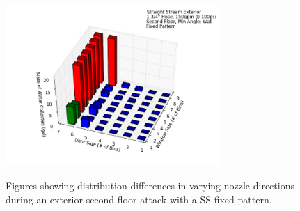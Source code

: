 \documentclass{article}
\begin{document}
\begin{figure}[ht]
\begin{tabular*}{\textwidth}{lr}
\end{tabular*}
\centering
\includegraphics[width=3.2in]{../ADD_Analysis/Figures/15-12-07_155226_Datafile_Straight_Stream_Exterior.png} \\
\caption{Figures showing distribution differences in varying nozzle directions during an exterior second floor attack with a SS fixed pattern.}
\label{fig:Exterior_Second_Floor_Varying_Nozzle_Directions_SS_Fixed_Pattern}
\end{figure}

\clearpage
\end{document}
